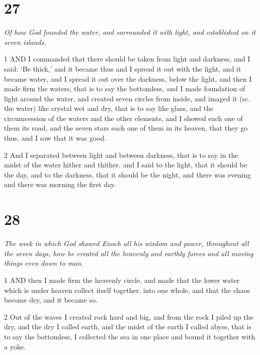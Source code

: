 \chapter{27}

\par \textit{Of how God founded the water, and surrounded it with light, and established on it seven islands.}

\par 1 AND I commanded that there should be taken from light and darkness, and I said: ‘Be thick,’ and it became thus and I spread it out with the light, and it became water, and I spread it out over the darkness, below the light, and then I made firm the waters, that is to say the bottomless, and I made foundation of light around the water, and created seven circles from inside, and imaged it (sc. the water) like crystal wet and dry, that is to say like glass, and the circumcession of the waters and the other elements, and I showed each one of them its road, and the seven stars each one of them in its heaven, that they go thus, and I saw that it was good.

\par 2 And I separated between light and between darkness, that is to say in the midst of the water hither and thither, and I said to the light, that it should be the day, and to the darkness, that it should be the night, and there was evening and there was morning the first day.

\chapter{28}

\par \textit{The week in which God showed Enoch all his wisdom and power, throughout all the seven days, how he created all the heavenly and earthly forces and all moving things even down to man.}

\par 1 AND then I made firm the heavenly circle, and made that the lower water which is under heaven collect itself together, into one whole, and that the chaos become dry, and it became so.

\par 2 Out of the waves I created rock hard and big, and from the rock I piled up the dry, and the dry I called earth, and the midst of the earth I called abyss, that is to say the bottomless, I collected the sea in one place and bound it together with a yoke.

